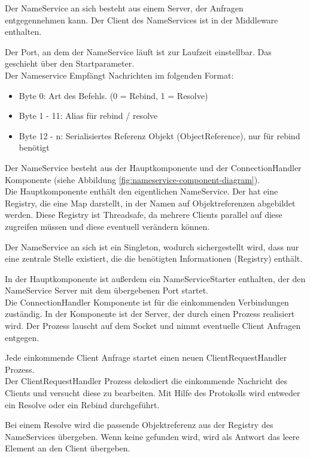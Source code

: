 \documentclass{article}
\begin{document}
Der NameService an sich besteht aus einem Server, der Anfragen entgegennehmen kann.
Der Client des NameServices ist in der Middleware enthalten.

Der Port, an dem der NameService läuft ist zur Laufzeit einstellbar. Das geschieht über den Startparameter.\\

Der Nameservice Empfängt Nachrichten im folgenden Format:
\begin{itemize}
\item Byte 0: Art des Befehls. (0 = Rebind, 1 = Resolve)
\item Byte 1 - 11: Alias für rebind / resolve
\item Byte 12 - n: Serialisiertes Referenz Objekt (ObjectReference), nur für rebind benötigt
\end{itemize}

Der NameService besteht aus der Hauptkomponente und der ConnectionHandler Komponente (siehe Abbildung
\ref{fig:nameservice-component-diagram}).\\

Die Hauptkomponente enthält den eigentlichen NameService. Der hat eine Registry, die eine Map darstellt, in der Namen
auf Objektreferenzen abgebildet werden. Diese Registry ist Threadsafe, da mehrere Clients parallel auf diese
zugreifen müssen und diese eventuell verändern können.

Der NameService an sich ist ein Singleton, wodurch sichergestellt wird, dass nur eine zentrale Stelle existiert, die
die benötigten Informationen (Registry) enthält.

In der Hauptkomponente ist außerdem ein NameServiceStarter enthalten, der den NameService Server mit dem übergebenen
Port startet.\\

Die ConnectionHandler Komponente ist für die einkommenden Verbindungen zuständig. In der Komponente ist der Server, der
durch einen Prozess realisiert wird. Der Prozess lauscht auf dem Socket und nimmt eventuelle Client Anfragen entgegen.

Jede einkommende Client Anfrage startet einen neuen ClientRequestHandler Prozess.\\

Der ClientRequestHandler Prozess dekodiert die einkommende Nachricht des Clients und versucht diese zu bearbeiten.
Mit Hilfe des Protokolls wird entweder ein Resolve oder ein Rebind durchgeführt.

Bei einem Resolve wird die passende Objektreferenz aus der Registry des NameServices übergeben. Wenn keine gefunden
wird, wird als Antwort das leere Element an den Client übergeben.
\end{document}

